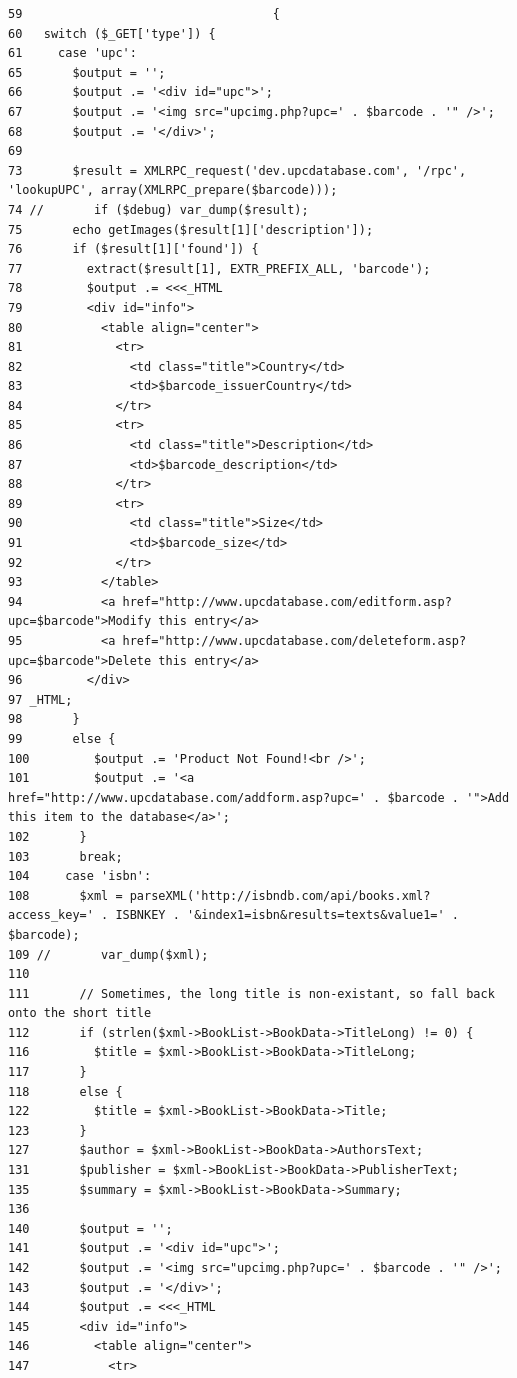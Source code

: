 \begin{Code}\begin{verbatim}59                                   {
60   switch ($_GET['type']) {
61     case 'upc':
65       $output = '';
66       $output .= '<div id="upc">';
67       $output .= '<img src="upcimg.php?upc=' . $barcode . '" />';
68       $output .= '</div>';
69 
73       $result = XMLRPC_request('dev.upcdatabase.com', '/rpc', 'lookupUPC', array(XMLRPC_prepare($barcode)));
74 //       if ($debug) var_dump($result);
75       echo getImages($result[1]['description']);
76       if ($result[1]['found']) {
77         extract($result[1], EXTR_PREFIX_ALL, 'barcode');
78         $output .= <<<_HTML
79         <div id="info">
80           <table align="center">
81             <tr>
82               <td class="title">Country</td>
83               <td>$barcode_issuerCountry</td>
84             </tr>
85             <tr>
86               <td class="title">Description</td>
87               <td>$barcode_description</td>
88             </tr>
89             <tr>
90               <td class="title">Size</td>
91               <td>$barcode_size</td>
92             </tr>
93           </table>
94           <a href="http://www.upcdatabase.com/editform.asp?upc=$barcode">Modify this entry</a>
95           <a href="http://www.upcdatabase.com/deleteform.asp?upc=$barcode">Delete this entry</a>
96         </div>
97 _HTML;
98       }
99       else {
100         $output .= 'Product Not Found!<br />';
101         $output .= '<a href="http://www.upcdatabase.com/addform.asp?upc=' . $barcode . '">Add this item to the database</a>';
102       }
103       break;
104     case 'isbn':
108       $xml = parseXML('http://isbndb.com/api/books.xml?access_key=' . ISBNKEY . '&index1=isbn&results=texts&value1=' . $barcode);
109 //       var_dump($xml);
110 
111       // Sometimes, the long title is non-existant, so fall back onto the short title
112       if (strlen($xml->BookList->BookData->TitleLong) != 0) {
116         $title = $xml->BookList->BookData->TitleLong;
117       }
118       else {
122         $title = $xml->BookList->BookData->Title;
123       }
127       $author = $xml->BookList->BookData->AuthorsText;
131       $publisher = $xml->BookList->BookData->PublisherText;
135       $summary = $xml->BookList->BookData->Summary;
136 
140       $output = '';
141       $output .= '<div id="upc">';
142       $output .= '<img src="upcimg.php?upc=' . $barcode . '" />';
143       $output .= '</div>';
144       $output .= <<<_HTML
145       <div id="info">
146         <table align="center">
147           <tr>

\end{verbatim}
\end{Code}
